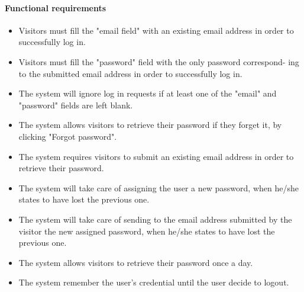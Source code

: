 \paragraph{Functional requirements }
\begin{itemize}
	\item Visitors must fill the "email field" with an existing email address in order to successfully log in.
	\item Visitors must fill the "password" field with the only password correspond- ing to the submitted email address in order to successfully log in.
	\item The system will ignore log in requests if at least one of the "email" and "password" fields are left blank.
	\item The system allows visitors to retrieve their password if they forget it, by clicking "Forgot password".
	\item The system requires visitors to submit an existing email address in order to retrieve their password.
	\item The system will take care of assigning the user a new password, when he/she states to have lost the previous one.
	\item The system will take care of sending to the email address submitted by the visitor the new assigned password, when he/she states to have lost the previous one.
	\item The system allows visitors to retrieve their password once a day.
	\item The system remember the user's credential until the user decide to logout.
\end{itemize}
\newpage

